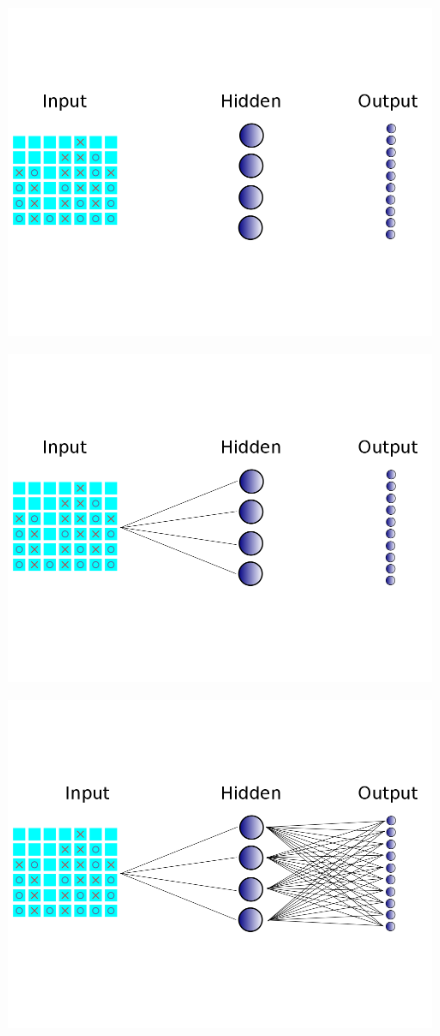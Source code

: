 \begin{frame}
\begin{figure}
\includegraphics[width=0.8 \textwidth]{"simple neural net no lines"}
\end{figure}
\end{frame}

\begin{frame}
\begin{figure}
\includegraphics[width=0.8 \textwidth]{"simple neural net half lines"}
\end{figure}
\end{frame}

\begin{frame}
\begin{figure}
\includegraphics[width=0.8 \textwidth]{"simple neural net all lines"}
\end{figure}
\end{frame}

